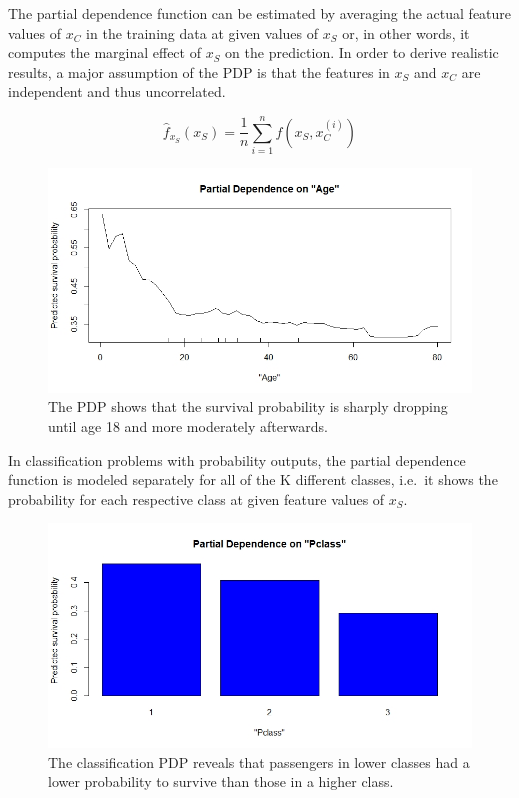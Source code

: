 \documentclass[
]{krantz}
\begin{document}
The partial dependence function can be estimated by averaging the actual feature values of \(x_C\) in the training data at given values of \(x_S\) or, in other words, it computes the marginal effect of \(x_S\) on the prediction. In order to derive realistic results, a major assumption of the PDP is that the features in \(x_S\) and \(x_C\) are independent and thus uncorrelated.\citep{hastie2013elements}

\[\hat{f}_{x_S}(x_S)=\frac{1}{n}\sum_{i=1}^{n}f(x_S, x^{(i)}_{C})\]

\begin{figure}
\includegraphics[width=0.9\linewidth]{images/age_pdp} \caption{The PDP shows that the survival probability is sharply dropping until age 18 and more moderately afterwards.}\label{fig:unnamed-chunk-1}
\end{figure}

In classification problems with probability outputs, the partial dependence function is modeled separately for all of the K different classes, i.e.~it shows the probability for each respective class at given feature values of \(x_S\).\citep{hastie2013elements}

\begin{figure}
\includegraphics[width=0.9\linewidth]{images/pdp_class} \caption{The classification PDP reveals that passengers in lower classes had a lower probability to survive than those in a higher class.}\label{fig:unnamed-chunk-2}
\end{figure}
\end{document}
